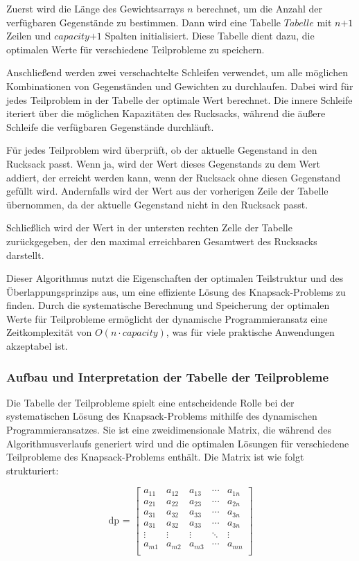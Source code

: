 \begin{itemize}
Zuerst wird die Länge des Gewichtsarrays \( \textit{n} \) berechnet, um die Anzahl der verfügbaren Gegenstände zu bestimmen.
Dann wird eine Tabelle \( \textit{Tabelle} \) mit \( \textit{n+1} \) Zeilen und \( \textit{capacity+1} \) Spalten initialisiert.
Diese Tabelle dient dazu, die optimalen Werte für verschiedene Teilprobleme zu speichern.

Anschließend werden zwei verschachtelte Schleifen verwendet, um alle möglichen Kombinationen von Gegenständen und Gewichten
zu durchlaufen. Dabei wird für jedes Teilproblem in der Tabelle der optimale Wert berechnet. Die innere Schleife iteriert
über die möglichen Kapazitäten des Rucksacks, während die äußere Schleife die verfügbaren Gegenstände durchläuft.

Für jedes Teilproblem wird überprüft, ob der aktuelle Gegenstand in den Rucksack passt. Wenn ja, wird der Wert dieses
Gegenstands zu dem Wert addiert, der erreicht werden kann, wenn der Rucksack ohne diesen Gegenstand gefüllt wird. Andernfalls
wird der Wert aus der vorherigen Zeile der Tabelle übernommen, da der aktuelle Gegenstand nicht in den Rucksack passt.

Schließlich wird der Wert in der untersten rechten Zelle der Tabelle zurückgegeben, der den maximal erreichbaren Gesamtwert
des Rucksacks darstellt.

Dieser Algorithmus nutzt die Eigenschaften der optimalen Teilstruktur und des Überlappungsprinzips aus, um eine effiziente
Lösung des Knapsack-Problems zu finden. Durch die systematische Berechnung und Speicherung der optimalen Werte für Teilprobleme
ermöglicht der dynamische Programmieransatz eine Zeitkomplexität von \( O(n \cdot capacity) \), was für viele praktische
Anwendungen akzeptabel ist.

\subsubsection*{Aufbau und Interpretation der Tabelle der Teilprobleme}
Die Tabelle der Teilprobleme spielt eine entscheidende Rolle bei der systematischen Lösung des Knapsack-Problems mithilfe
des dynamischen Programmieransatzes. Sie ist eine zweidimensionale Matrix, die während des Algorithmusverlaufs generiert
wird und die optimalen Lösungen für verschiedene Teilprobleme des Knapsack-Problems enthält. Die Matrix ist wie folgt strukturiert:

\[
\text{dp = }
\left[
\begin{array}{ccccc}
a_{11} & a_{12} & a_{13} & \cdots & a_{1n} \\
a_{21} & a_{22} & a_{23} & \cdots & a_{2n} \\
a_{31} & a_{32} & a_{33} & \cdots & a_{3n} \\
a_{31} & a_{32} & a_{33} & \cdots & a_{3n} \\
\vdots & \vdots & \vdots & \ddots & \vdots \\
a_{m1} & a_{m2} & a_{m3} & \cdots & a_{mn} \\
\end{array}
\right]
\]


\end{itemize}
